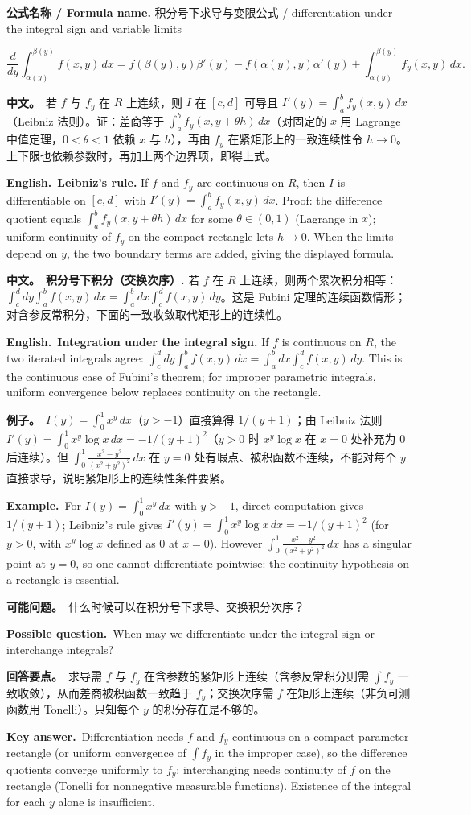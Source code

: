 \documentclass[UTF8,11pt,a4paper]{ctexart}
\newcommand{\BOTH}[2]{\par\noindent\textbf{中文。}\ #1\par\noindent\textbf{English.}\ #2\par}
\newcommand{\EX}[2]{\par\noindent\textbf{例子。}\ #1\par\noindent\textbf{Example.}\ #2\par}
\newcommand{\FORMULA}[2]{\par\noindent\textbf{公式名称 / Formula name.} #1 / #2\par}
\newcommand{\ASK}[4]{\begin{samepage}\par\noindent\textbf{可能问题。}\ #1\par\noindent\textbf{Possible question.}\ #2\par\noindent\textbf{回答要点。}\ #3\par\noindent\textbf{Key answer.}\ #4\medskip\end{samepage}}
\begin{document}
\FORMULA{积分号下求导与变限公式}{differentiation under the integral sign and variable limits}
\[
\frac{d}{dy}\int_{\alpha(y)}^{\beta(y)}f(x,y)\,dx
=f(\beta(y),y)\beta'(y)-f(\alpha(y),y)\alpha'(y)+\int_{\alpha(y)}^{\beta(y)}f_y(x,y)\,dx .
\]

\BOTH{若 $f$ 与 $f_y$ 在 $R$ 上连续，则 $I$ 在 $[c,d]$ 可导且 $I'(y)=\int_a^b f_y(x,y)\,dx$（Leibniz 法则）。证：差商等于 $\int_a^b f_y(x,y+\theta h)\,dx$（对固定的 $x$ 用 Lagrange 中值定理，$0<\theta<1$ 依赖 $x$ 与 $h$），再由 $f_y$ 在紧矩形上的一致连续性令 $h\to0$。上下限也依赖参数时，再加上两个边界项，即得上式。}{\textbf{Leibniz's rule.} If $f$ and $f_y$ are continuous on $R$, then $I$ is differentiable on $[c,d]$ with $I'(y)=\int_a^b f_y(x,y)\,dx$. Proof: the difference quotient equals $\int_a^b f_y(x,y+\theta h)\,dx$ for some $\theta\in(0,1)$ (Lagrange in $x$); uniform continuity of $f_y$ on the compact rectangle lets $h\to0$. When the limits depend on $y$, the two boundary terms are added, giving the displayed formula.}

\BOTH{\textbf{积分号下积分（交换次序）.} 若 $f$ 在 $R$ 上连续，则两个累次积分相等：$\int_c^d dy\int_a^bf(x,y)\,dx=\int_a^b dx\int_c^df(x,y)\,dy$。这是 Fubini 定理的连续函数情形；对含参反常积分，下面的一致收敛取代矩形上的连续性。}{\textbf{Integration under the integral sign.} If $f$ is continuous on $R$, the two iterated integrals agree: $\int_c^d dy\int_a^bf(x,y)\,dx=\int_a^b dx\int_c^df(x,y)\,dy$. This is the continuous case of Fubini's theorem; for improper parametric integrals, uniform convergence below replaces continuity on the rectangle.}

\EX{$I(y)=\int_0^1x^y\,dx$（$y>-1$）直接算得 $1/(y+1)$；由 Leibniz 法则 $I'(y)=\int_0^1x^y\log x\,dx=-1/(y+1)^2$（$y>0$ 时 $x^y\log x$ 在 $x=0$ 处补充为 $0$ 后连续）。但 $\int_0^1\frac{x^2-y^2}{(x^2+y^2)^2}\,dx$ 在 $y=0$ 处有瑕点、被积函数不连续，不能对每个 $y$ 直接求导，说明紧矩形上的连续性条件要紧。}{For $I(y)=\int_0^1x^y\,dx$ with $y>-1$, direct computation gives $1/(y+1)$; Leibniz's rule gives $I'(y)=\int_0^1x^y\log x\,dx=-1/(y+1)^2$ (for $y>0$, with $x^y\log x$ defined as $0$ at $x=0$). However $\int_0^1\frac{x^2-y^2}{(x^2+y^2)^2}\,dx$ has a singular point at $y=0$, so one cannot differentiate pointwise: the continuity hypothesis on a rectangle is essential.}

\ASK{什么时候可以在积分号下求导、交换积分次序？}{When may we differentiate under the integral sign or interchange integrals?}{求导需 $f$ 与 $f_y$ 在含参数的紧矩形上连续（含参反常积分则需 $\int f_y$ 一致收敛），从而差商被积函数一致趋于 $f_y$；交换次序需 $f$ 在矩形上连续（非负可测函数用 Tonelli）。只知每个 $y$ 的积分存在是不够的。}{Differentiation needs $f$ and $f_y$ continuous on a compact parameter rectangle (or uniform convergence of $\int f_y$ in the improper case), so the difference quotients converge uniformly to $f_y$; interchanging needs continuity of $f$ on the rectangle (Tonelli for nonnegative measurable functions). Existence of the integral for each $y$ alone is insufficient.}
\end{document}
